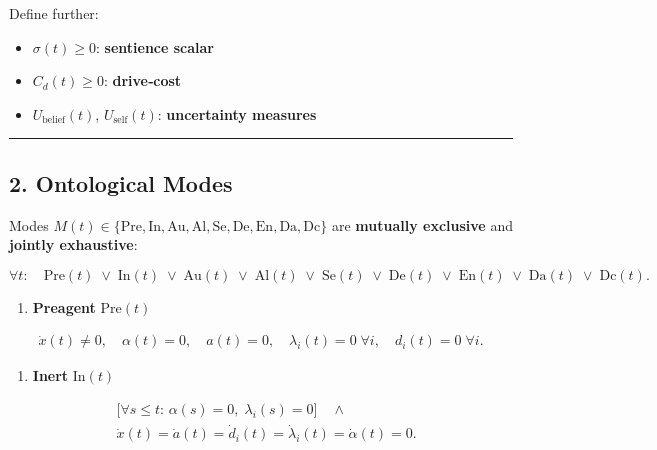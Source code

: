 \documentclass[
]{article}
\providecommand{\tightlist}{%
  \setlength{\itemsep}{0pt}\setlength{\parskip}{0pt}}
\begin{document}
Define further:

\begin{itemize}
\tightlist
\item
  \(\sigma(t)\ge0\): \textbf{sentience scalar}
\item
  \(C_d(t)\ge0\): \textbf{drive‐cost}
\item
  \(U_{\mathrm{belief}}(t)\), \(U_{\mathrm{self}}(t)\):
  \textbf{uncertainty measures}
\end{itemize}

\begin{center}\rule{0.5\linewidth}{0.5pt}\end{center}

\hypertarget{2-ontological-modes}{%
\subsection{2. Ontological Modes}\label{2-ontological-modes}}

Modes
\(M(t)\in\{\mathrm{Pre},\mathrm{In},\mathrm{Au},\mathrm{Al},\mathrm{Se},\mathrm{De},\mathrm{En},\mathrm{Da},\mathrm{Dc}\}\)
are \textbf{mutually exclusive} and \textbf{jointly exhaustive}:

\[ \forall t:\quad \mathrm{Pre}(t)\;\lor\;\mathrm{In}(t)\;\lor\;\mathrm{Au}(t)\;\lor\;\mathrm{Al}(t)\;\lor\;\mathrm{Se}(t)\;\lor\;\mathrm{De}(t)\;\lor\;\mathrm{En}(t)\;\lor\;\mathrm{Da}(t)\;\lor\;\mathrm{Dc}(t). \]

\begin{enumerate}
\def\labelenumi{\arabic{enumi}.}
\tightlist
\item
  \textbf{Preagent} \(\mathrm{Pre}(t)\)
\end{enumerate}

\[ \begin{aligned} \dot x(t)\neq0,\quad \alpha(t)=0,\quad a(t)=0,\quad \lambda_i(t)=0\;\forall i,\quad d_i(t)=0\;\forall i. \end{aligned} \]

\begin{enumerate}
\def\labelenumi{\arabic{enumi}.}
\setcounter{enumi}{1}
\tightlist
\item
  \textbf{Inert} \(\mathrm{In}(t)\)
\end{enumerate}

\[ \begin{aligned} &\bigl[\forall s\le t:\,\alpha(s)=0,\;\lambda_i(s)=0\bigr]\quad\land\\ &\dot x(t)=\dot a(t)=\dot d_i(t)=\dot\lambda_i(t)=\dot\alpha(t)=0. \end{aligned} \]
\end{document}
